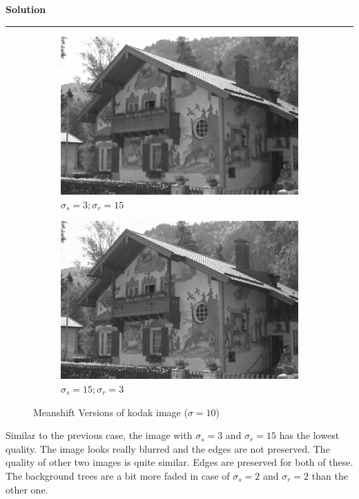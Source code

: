 \documentclass[a4paper]{article}
\newenvironment{solution}[2][]{%
    \begin{mdframed}[linecolor=green!60!black, linewidth=2pt, roundcorner=10pt, backgroundcolor=green!5!white, skipabove=12pt, skipbelow=12pt]%
        \textbf{\large #2} %
        \par\noindent\rule{\textwidth}{0.4pt} %
        \vspace{0.5em} %
}{%
    \end{mdframed}%
}
\begin{document}
\begin{solution}{Solution}
\begin{figure}[H]
    \begin{subfigure}[b]{0.24\textwidth}
        \centering
        \includegraphics[width=\textwidth]{../images/filtered_kodak24_meanshift_sigma_10_sigma_s_3_sigma_r_15.png}
        \caption{$\sigma_s=3;\sigma_r=15$}
        \label{fig:subfig3}
    \end{subfigure}
    \begin{subfigure}[b]{0.24\textwidth}
        \centering
        \includegraphics[width=\textwidth]{../images/filtered_kodak24_meanshift_sigma_10_sigma_s_15_sigma_r_3.png}
        \caption{$\sigma_s=15;\sigma_r=3$}
        \label{fig:subfig3}
    \end{subfigure}
    
    \caption{Meanshift Versions of kodak image ($\sigma=10$)}
    \label{fig:overall}
\end{figure}


Similar to the previous case, the image with $\sigma_s = 3$ and $\sigma_r = 15$ has the lowest quality. The image looks really blurred and the edges are not preserved. The quality of other two images is quite similar. Edges are preserved for both of these. The background trees are a bit more faded in case of $\sigma_s=2$ and $\sigma_r=2$ than the other one.
\end{solution}
\end{document}
